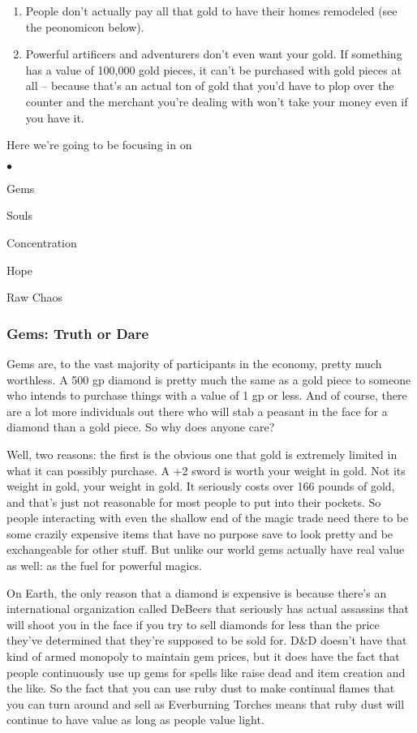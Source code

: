 \begin{enumerate} \itemspace
   \item People don't actually pay all that gold to have their homes remodeled (see the peonomicon below).
   \item Powerful artificers and adventurers don't even want your gold. If something has a value of 100,000 gold pieces, it can't be purchased with gold pieces at all -- because that's an actual ton of gold that you'd have to plop over the counter and the merchant you're dealing with won't take your money even if you have it.
\end{enumerate}

Here we're going to be focusing in on

\begin{list}{$\bullet$}{\itemspace}
    \item Gems
    \item Souls
    \item Concentration
    \item Hope
    \item Raw Chaos
\end{list}

\subsubsection{Gems: Truth or Dare}

Gems are, to the vast majority of participants in the economy, pretty much worthless. A 500 gp diamond is pretty much the same as a gold piece to someone who intends to purchase things with a value of 1 gp or less. And of course, there are a lot more individuals out there who will stab a peasant in the face for a diamond than a gold piece. So why does anyone care?

Well, two reasons: the first is the obvious one that gold is extremely limited in what it can possibly purchase. A +2 sword is worth your weight in gold. Not its weight in gold, your weight in gold. It seriously costs over 166 pounds of gold, and that's just not reasonable for most people to put into their pockets. So people interacting with even the shallow end of the magic trade need there to be some crazily expensive items that have no purpose save to look pretty and be exchangeable for other stuff. But unlike our world gems actually have real value as well: as the fuel for powerful magics.

On Earth, the only reason that a diamond is expensive is because there's an international organization called DeBeers that seriously has actual assassins that will shoot you in the face if you try to sell diamonds for less than the price they've determined that they're supposed to be sold for. D\&D doesn't have that kind of armed monopoly to maintain gem prices, but it does have the fact that people continuously use up gems for spells like raise dead and item creation and the like. So the fact that you can use ruby dust to make continual flames that you can turn around and sell as Everburning Torches means that ruby dust will continue to have value as long as people value light.

